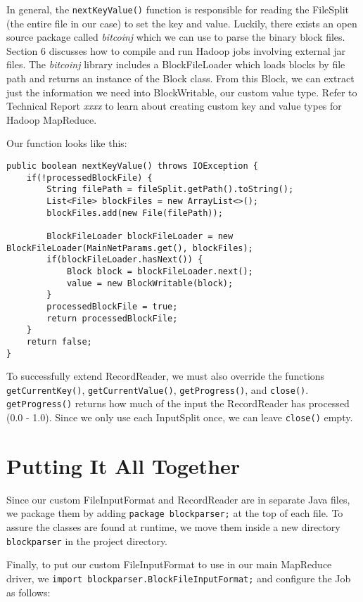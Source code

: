 \documentclass[9pt,twocolumn,twoside]{idsi}
\begin{document}
In general, the \lstinline{nextKeyValue()} function is responsible for reading the FileSplit (the entire file in our case) to set the key and value. Luckily, there exists an open source package called \emph{bitcoinj} which we can use to parse the binary block files. Section 6 discusses how to compile and run Hadoop jobs involving external jar files. The \emph{bitcoinj} library includes a BlockFileLoader which loads blocks by file path and returns an instance of the Block class. From this Block, we can extract just the information we need into BlockWritable, our custom value type. Refer to Technical Report \emph{xxxx} to learn about creating custom key and value types for Hadoop MapReduce.

Our function looks like this:

\begin{lstlisting}
public boolean nextKeyValue() throws IOException {
    if(!processedBlockFile) {
        String filePath = fileSplit.getPath().toString();
        List<File> blockFiles = new ArrayList<>();
        blockFiles.add(new File(filePath));

        BlockFileLoader blockFileLoader = new BlockFileLoader(MainNetParams.get(), blockFiles);
        if(blockFileLoader.hasNext()) {
            Block block = blockFileLoader.next();
            value = new BlockWritable(block);
        }
        processedBlockFile = true;
        return processedBlockFile;
    }
    return false;
}
\end{lstlisting}

To successfully extend RecordReader, we must also override the functions \lstinline{getCurrentKey()}, \lstinline{getCurrentValue()}, \lstinline{getProgress()}, and \lstinline{close()}. \lstinline{getProgress()} returns how much of the input the RecordReader has processed (0.0 - 1.0). Since we only use each InputSplit once, we can leave \lstinline{close()} empty.

\section{Putting It All Together}

Since our custom FileInputFormat and RecordReader are in separate Java files, we package them by adding \lstinline{package blockparser;} at the top of each file. To assure the classes are found at runtime, we move them inside a new directory \lstinline{blockparser} in the project directory.

Finally, to put our custom FileInputFormat to use in our main MapReduce driver, we \lstinline{import blockparser.BlockFileInputFormat;} and configure the Job as follows:
\end{document}
